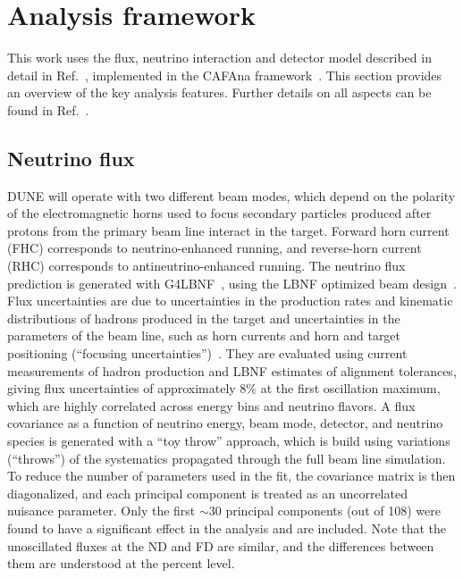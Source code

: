 \section{Analysis framework}
\label{sec:analysis_framework}
This work uses the flux, neutrino interaction and detector model described in detail in Ref.~\cite{Abi:2020qib}, implemented in the CAFAna framework~\cite{CAFAna}. This section provides an overview of the key analysis features. Further details on all aspects can be found in Ref.~\cite{Abi:2020qib}.

\subsection{Neutrino flux}
DUNE will operate with two different beam modes, which depend on the polarity of the electromagnetic horns used to focus secondary particles produced after protons from the primary beam line interact in the target. Forward horn current (FHC) corresponds to neutrino-enhanced running, and reverse-horn current (RHC) corresponds to antineutrino-enhanced running. The neutrino flux prediction is generated with G4LBNF~\cite{Aliaga:2016oaz,Abi:2020evt}, using the LBNF optimized beam design~\cite{Abi:2020evt}. Flux uncertainties are due to uncertainties in the production rates and kinematic distributions of hadrons produced in the target and uncertainties in the parameters of the beam line, such as horn currents and horn and target positioning (``focusing uncertainties'')~\cite{Abi:2020evt}. They are evaluated using current measurements of hadron production and LBNF estimates of alignment tolerances, giving flux uncertainties of approximately 8\% at the first oscillation maximum, which are highly correlated across energy bins and neutrino flavors. A flux covariance as a function of neutrino energy, beam mode, detector, and neutrino species is generated with a ``toy throw'' approach, which is build using variations (``throws'') of the systematics propagated through the full beam line simulation. To reduce the number of parameters used in the fit, the covariance matrix is then diagonalized, and each principal component is treated as an uncorrelated nuisance parameter. Only the first $\sim$30 principal components (out of 108) were found to have a significant effect in the analysis and are included. Note that the unoscillated fluxes at the ND and FD are similar, and the differences between them are understood at the percent level.


